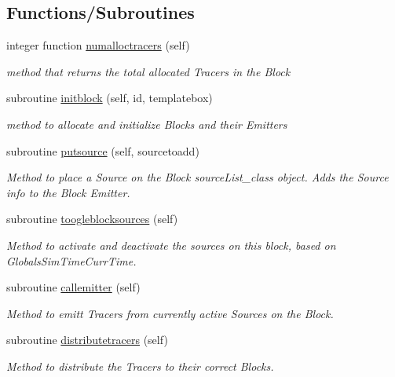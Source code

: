 \subsection*{Functions/\+Subroutines}
\begin{DoxyCompactItemize}
\item 
integer function \mbox{\hyperlink{namespaceblocks__mod_a7202fad0fdc07ff9111e61e3aa513af9}{numalloctracers}} (self)
\begin{DoxyCompactList}\small\item\em method that returns the total allocated Tracers in the Block \end{DoxyCompactList}\item 
subroutine \mbox{\hyperlink{namespaceblocks__mod_a534ca69b17b6f54ee07f995b02feff39}{initblock}} (self, id, templatebox)
\begin{DoxyCompactList}\small\item\em method to allocate and initialize Blocks and their Emitters \end{DoxyCompactList}\item 
subroutine \mbox{\hyperlink{namespaceblocks__mod_ae3bd1bfeee831f4b41932839495bb108}{putsource}} (self, sourcetoadd)
\begin{DoxyCompactList}\small\item\em Method to place a Source on the Block source\+List\+\_\+class object. Adds the Source info to the Block Emitter. \end{DoxyCompactList}\item 
subroutine \mbox{\hyperlink{namespaceblocks__mod_ab9e57cbf0103b632b2b2dfa4e4d4139c}{toogleblocksources}} (self)
\begin{DoxyCompactList}\small\item\em Method to activate and deactivate the sources on this block, based on GlobalsSim\+TimeCurr\+Time. \end{DoxyCompactList}\item 
subroutine \mbox{\hyperlink{namespaceblocks__mod_a2c3cf5113e1422d812c2c869afde2729}{callemitter}} (self)
\begin{DoxyCompactList}\small\item\em Method to emitt Tracers from currently active Sources on the Block. \end{DoxyCompactList}\item 
subroutine \mbox{\hyperlink{namespaceblocks__mod_aa178415bcc40cf169744d356e1a09c6b}{distributetracers}} (self)
\begin{DoxyCompactList}\small\item\em Method to distribute the Tracers to their correct Blocks. \end{DoxyCompactList}\item 

\end{DoxyCompactItemize}
